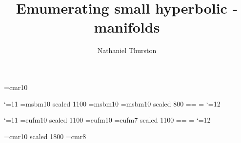 

\def\bye{}
 \font\tenrm=cmr10

\SetepsfEPSFSpecial
\HideDisplacementBoxes
\def\figin#1#2{
$$
 {\BoxedEPSF{#1.eps scaled
#2}%
}%
$$
\noindent}
\catcode`\@=11
\font\twelvemsb=msbm10 scaled 1100
\font\tenmsb=msbm10
\font\ninemsb=msbm10 scaled 800
\newfam\msbfam
\textfont\msbfam=\twelvemsb  \scriptfont\msbfam=\ninemsb
  \scriptscriptfont\msbfam=\ninemsb
\def\msb@{\hexnumber@\msbfam}
\def\Bbb{\relax\ifmmode\let\next\Bbb@\else
 \def\next{\errmessage{Use \string\Bbb\space only in math
mode}}\fi\next}
\def\Bbb@#1{{\Bbb@@{#1}}}
\def\Bbb@@#1{\fam\msbfam#1}
\catcode`\@=12


 \catcode`\@=11
\font\twelveeuf=eufm10 scaled 1100
\font\teneuf=eufm10
\font\nineeuf=eufm7 scaled 1100%
\newfam\euffam
\textfont\euffam=\twelveeuf  \scriptfont\euffam=\teneuf
  \scriptscriptfont\euffam=\nineeuf
\def\euf@{\hexnumber@\euffam}
\def\frak{\relax\ifmmode\let\next\frak@\else
 \def\next{\errmessage{Use \string\frak\space only in math
mode}}\fi\next}
\def\frak@#1{{\frak@@{#1}}}
\def\frak@@#1{\fam\euffam#1}
\catcode`\@=12

\title{} %
\shorttitle{} %



\font\titr=cmr10 scaled 1800
\font\shortr=cmr8
\def\ritem#1{\item[{\rm #1}]}
\vglue-1.5in
\title{Emumerating small hyperbolic {}-manifolds} %
\author{Nathaniel Thurston}

\bye
